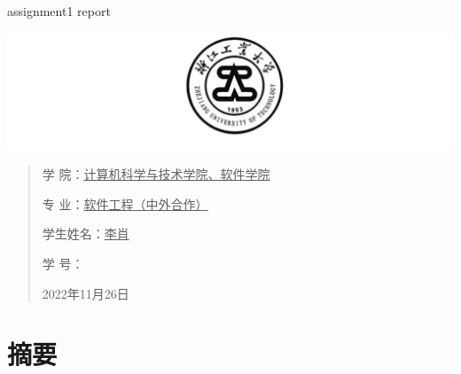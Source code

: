 \documentclass[UTF8]{ctexart}
\date{}
\begin{document}
\begin{center}
    \quad \\
    \quad \\
    \huge  assignment1 report
\end{center}
\vskip 3.5cm

\begin{center}
    \includegraphics[scale=0.6]{img/logo.png}
\end{center}
\vskip 4.5cm

\begin{quotation}
    \songti \fontsize{15}{15}
    \doublespacing
    \par\setlength\parindent{9em}
    \quad

    学\hspace{0.61cm} 院：\underline{\quad 计算机科学与技术学院、软件学院}

    专\hspace{0.61cm} 业：\underline{\qquad 软件工程（中外合作）\qquad\qquad  }

    学生姓名：\underline{\qquad\qquad\qquad 李肖 \qquad\qquad\qquad\qquad }

    学\hspace{0.61cm} 号：\underline{\qquad{} \qquad\qquad\qquad}

    \vskip 1cm
    \centering
    2022年11月26日
\end{quotation}

\newpage
\section{摘要}
\end{document}
